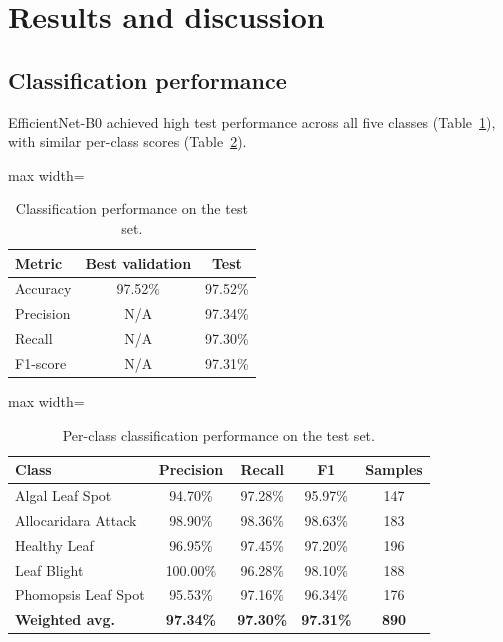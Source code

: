 \documentclass[final,5p,times,twocolumn,authoryear]{elsarticle}
\begin{document}
\section{Results and discussion}
\label{sec:results}

\subsection{Classification performance}

EfficientNet-B0 achieved high test performance across all five classes (Table~\ref{tab:classification}), with similar per-class scores (Table~\ref{tab:classification_perclass}).

\begin{table}[!htbp]
\centering
\caption{Classification performance on the test set.}
\label{tab:classification}
\begin{adjustbox}{max width=\columnwidth}
\begin{tabular}{lcc}
\toprule
\textbf{Metric} & \textbf{Best validation} & \textbf{Test} \\
\midrule
Accuracy  & 97.52\% & 97.52\% \\
Precision & N/A     & 97.34\% \\
Recall    & N/A     & 97.30\% \\
F1-score  & N/A     & 97.31\% \\
\bottomrule
\end{tabular}
\end{adjustbox}
\end{table}

\begin{table}[!htbp]
\centering
\caption{Per-class classification performance on the test set.}
\label{tab:classification_perclass}
\begin{adjustbox}{max width=\columnwidth}
\begin{tabular}{lcccc}
\toprule
\textbf{Class} & \textbf{Precision} & \textbf{Recall} & \textbf{F1} & \textbf{Samples} \\
\midrule
Algal Leaf Spot     & 94.70\% & 97.28\% & 95.97\% & 147 \\
Allocaridara Attack & 98.90\% & 98.36\% & 98.63\% & 183 \\
Healthy Leaf        & 96.95\% & 97.45\% & 97.20\% & 196 \\
Leaf Blight         & 100.00\% & 96.28\% & 98.10\% & 188 \\
Phomopsis Leaf Spot & 95.53\% & 97.16\% & 96.34\% & 176 \\
\midrule
\textbf{Weighted avg.} & \textbf{97.34\%} & \textbf{97.30\%} & \textbf{97.31\%} & \textbf{890} \\
\bottomrule
\end{tabular}
\end{adjustbox}
\end{table}
\end{document}
